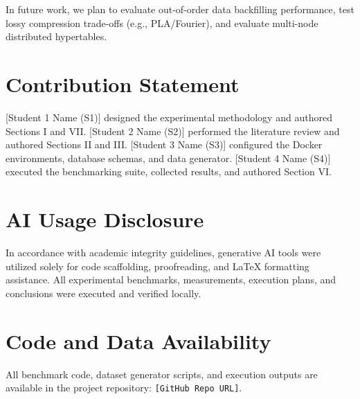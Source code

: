 \documentclass[conference,a4paper]{IEEEtran}
\begin{document}
In future work, we plan to evaluate out-of-order data backfilling performance, test lossy compression trade-offs (e.g., PLA/Fourier), and evaluate multi-node distributed hypertables.

\section*{Contribution Statement}
[Student 1 Name (S1)] designed the experimental methodology and authored Sections I and VII. [Student 2 Name (S2)] performed the literature review and authored Sections II and III. [Student 3 Name (S3)] configured the Docker environments, database schemas, and data generator. [Student 4 Name (S4)] executed the benchmarking suite, collected results, and authored Section VI.

\section*{AI Usage Disclosure}
In accordance with academic integrity guidelines, generative AI tools were utilized solely for code scaffolding, proofreading, and LaTeX formatting assistance. All experimental benchmarks, measurements, execution plans, and conclusions were executed and verified locally.

\section*{Code and Data Availability}
All benchmark code, dataset generator scripts, and execution outputs are available in the project repository: \texttt{[GitHub Repo URL]}.
\end{document}
